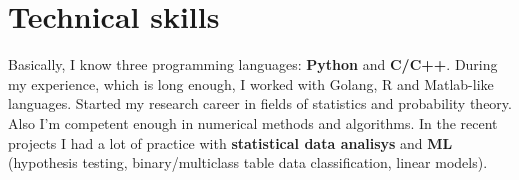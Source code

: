 \documentclass[12pt,a4paper,sans]{moderncv}
\begin{document}
\section{Technical skills}
\hspace{10mm}Basically, I know three programming languages: \textbf{Python} and \textbf{C/C++}.
During my experience, which is long enough, I worked with Golang, R and Matlab-like languages. \newline
Started my research career in fields of statistics and probability theory. Also I'm competent enough in numerical methods and algorithms. \newline
In the recent projects I had a lot of practice with \textbf{statistical data analisys} and \textbf{ML} (hypothesis testing, 
binary/multiclass table data classification, linear models). \newline
\end{document}
